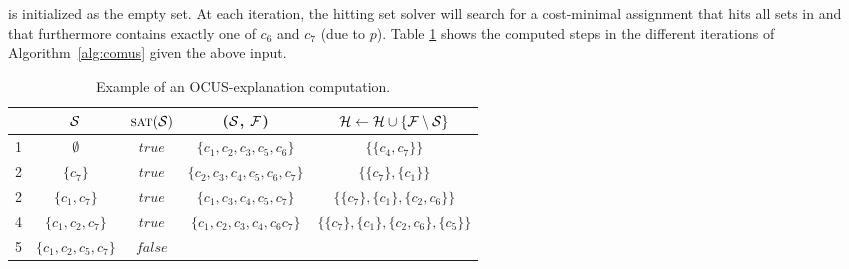 \begin{example}
	 
\setstohit is initialized as the empty set. At each iteration, the hitting set solver will search for a cost-minimal assignment that hits all sets in \setstohit and that furthermore contains exactly one of $c_6$ and $c_7$ (due to $p$).
	Table \ref{tab:explanation-steps-expanded} shows the computed steps in the different iterations of Algorithm~\ref{alg:comus} given the above input.
\begin{table}[!h]
	\centering
	\begin{adjustbox}{max width=\columnwidth}
			\begin{tabular}{lcccc} 
				&$\mathcal{S}$ & $\textsc{sat}(\mathcal{S})$ & \grow($\mathcal{S}$, $\mathcal{F} $) & $\mathcal{H}  \gets \mathcal{H}  \cup \{  \mathcal{F}  \setminus \mathcal{S}\}$\\ 
				\toprule[2pt]
				1 &$ \emptyset $ & $\mathit{true}$ & $\{c_1, c_2, c_3, c_5, c_6\}$    & $\{ \{c_4, c_7\}\}$   \\
				\midrule	
				2 &$\{ c_7\}$  &$\mathit{true}$ & $\{ c_2, c_3, c_4,c_5, c_6, c_7\}$   & $\{ \{c_7\}, \{c_1\}\}$  \\  
				\midrule
				2 &$\{ c_1, c_7\}$  &$\mathit{true}$ & $\{ c_1, c_3, c_4, c_5, c_7\}$   & $\{ \{c_7\}, \{c_1\}, \{c_2, c_6\}\}$  \\  
%				
				\midrule
				4& $\{ c_1, c_2, c_7 \}$  & $\mathit{true}$ & $\{c_1, c_2,c_3, c_4,c_6 c_7 \}$  & $\{ \{c_7\}, \{c_1\}, \{c_2, c_6\}, \{c_5\}\}$  \\ 
				\midrule
				5&  $\{ c_1, c_2, c_5, c_7 \}$ & $\mathit{false}$ & & \\
			\end{tabular}
	\end{adjustbox}
	\caption{Example of an OCUS-explanation computation.}
	\label{tab:explanation-steps-expanded}
\end{table}
\end{example}

